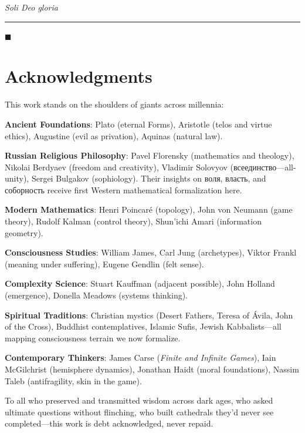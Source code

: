 \documentclass[11pt,a4paper]{article}
\theoremstyle{definition}
\theoremstyle{remark}
\begin{document}
\begin{small}
\begin{enumerate}
\begin{protocol}
\begin{center}
\vspace{0.5em}

\textit{Soli Deo gloria}

\vspace{0.5em}

\rule{0.6\linewidth}{0.5pt}
\end{center}

\begin{center}
\(\blacksquare\)
\end{center}

\vspace{2em}

\section*{Acknowledgments}

This work stands on the shoulders of giants across millennia:

\textbf{Ancient Foundations}: Plato (eternal Forms), Aristotle (telos and virtue ethics), Augustine (evil as privation), Aquinas (natural law).

\textbf{Russian Religious Philosophy}: Pavel Florensky (mathematics and theology), Nikolai Berdyaev (freedom and creativity), Vladimir Solovyov (всеединство—all-unity), Sergei Bulgakov (sophiology). Their insights on воля, власть, and соборность receive first Western mathematical formalization here.

\textbf{Modern Mathematics}: Henri Poincaré (topology), John von Neumann (game theory), Rudolf Kalman (control theory), Shun'ichi Amari (information geometry).

\textbf{Consciousness Studies}: William James, Carl Jung (archetypes), Viktor Frankl (meaning under suffering), Eugene Gendlin (felt sense).

\textbf{Complexity Science}: Stuart Kauffman (adjacent possible), John Holland (emergence), Donella Meadows (systems thinking).

\textbf{Spiritual Traditions}: Christian mystics (Desert Fathers, Teresa of Ávila, John of the Cross), Buddhist contemplatives, Islamic Sufis, Jewish Kabbalists—all mapping consciousness terrain we now formalize.

\textbf{Contemporary Thinkers}: James Carse (\textit{Finite and Infinite Games}), Iain McGilchrist (hemisphere dynamics), Jonathan Haidt (moral foundations), Nassim Taleb (antifragility, skin in the game).

To all who preserved and transmitted wisdom across dark ages, who asked ultimate questions without flinching, who built cathedrals they'd never see completed—this work is debt acknowledged, never repaid.


\end{protocol}
\end{enumerate}
\end{small}
\end{document}
